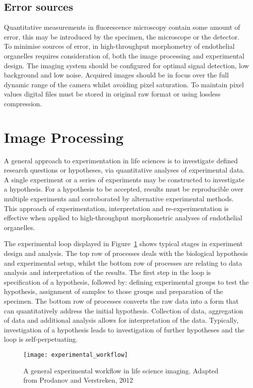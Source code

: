 \subsection{Error sources}
Quantitative measurements in fluorescence microscopy contain some amount of error, this may be introduced by the specimen, the microscope or the detector. To minimise sources of error, in high-throughput morphometry of endothelial organelles requires consideration of, both the image processing and experimental design. The imaging system should be configured for optimal signal detection, low background and low noise. Acquired images should be in focus over the full dynamic range of the camera whilst avoiding pixel saturation. To maintain pixel values digital files must be stored in original raw format or using lossless compression.


\section{Image Processing}
A general approach to experimentation in life sciences is to investigate defined research questions or hypotheses, via quantitative analyses of experimental data. A single experiment or a series of experiments may be constructed to investigate a hypothesis. For a hypothesis to be accepted, results must be reproducible over multiple experiments and corroborated by alternative experimental methods. This approach of experimentation, interpretation and re-experimentation is effective when applied to high-throughput morphometric analyses of endothelial organelles.

The experimental loop displayed in Figure~\ref{figure:endothelial_morphometry:introduction:experimental_workflow} shows typical stages in experiment design and analysis. The top row of processes deals with the biological hypothesis and experimental setup, whilst the bottom row of processes are relating to data analysis and interpretation of the results. The first step in the loop is specification of a hypothesis, followed by: defining experimental groups to test the hypothesis, assignment of samples to those groups and preparation of the specimen. The bottom row of processes converts the raw data into a form that can quantitatively address the initial hypothesis. Collection of data, aggregation of data and additional analysis allows for interpretation of the data. Typically, investigation of a hypothesis leads to investigation of further hypotheses and the loop is self-perpetuating.

\begin{figure}[htbp!]
	\centering
	\texttt{[image: experimental\_workflow]}
	\caption[Experimental workflow in life science imaging]{A general experimental workflow in life science imaging. Adapted from Prodanov and Verstreken, 2012~\cite{Prodanov2012}}
	\label{figure:endothelial_morphometry:introduction:experimental_workflow}
\end{figure}

